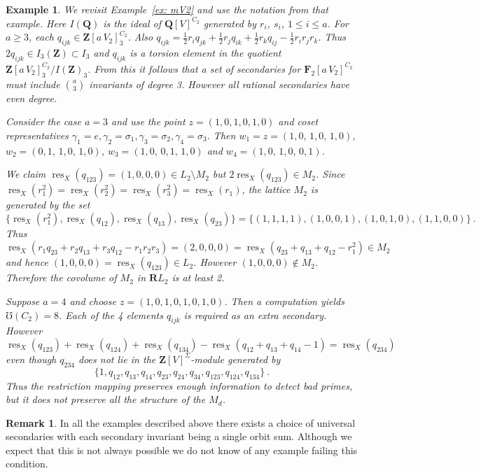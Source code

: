 \documentclass[12pt]{amsart}
\DeclareMathOperator{\res}{res}
\providecommand{\binom}[2]{{#1\choose#2}}
\renewcommand{\geq}{\geqslant}
\newcommand{\QQ}{\mathbf{Q}} %
\newcommand{\RR}{\mathbf{R}} %
\newcommand{\ZZ}{\mathbf{Z}} %
\newcommand{\FF}{\mathbf{F}} %
\newcommand{\QQ}{\mathbb{Q}} %
\newcommand{\RR}{\mathbb{R}} %
\newcommand{\ZZ}{\mathbb{Z}} %
\newcommand{\FF}{\mathbb{F}} %
\newtheorem{example}[thm]{Example}
\theoremstyle{definition}
\newtheorem{remark}[thm]{Remark}
\begin{document}
\begin{example}\label{mv2_comp}
  We revisit Example~\ref{ex: mV2} and use the notation from that example.
  Here $I(\QQ)$ is the ideal of $\QQ[V]^{C_2}$ generated by $r_i$, $s_i$, $1\le i \le a$. For $a \geq 3$, each $q_{ijk} \in \ZZ[a\,V_2]_3^{C_2}$.
Also  $q_{ijk}= \frac{1}{2} r_iq_{jk} + \frac{1}{2} r_jq_{ik} + \frac{1}{2} r_kq_{ij} - \frac{1}{2} r_{i}r_jr_k$.  Thus 
$2 q_{ijk} \in I_3(\ZZ) \subset I_3$ and $q_{ijk}$ is a torsion element in the quotient 
$\ZZ[a\,V_2]_3^{C_2}/I(\ZZ)_3$.  From this it follows that a set of secondaries for $\FF_2[a\,V_2]^{C_2}$
must include $\binom{a}{3}$ invariants of degree 3.  
However all rational secondaries have even degree.


Consider the case $a=3$ and use the point $z=(1,0,1,0,1,0)$ and coset representatives
$\gamma_1 = e,\gamma_2=\sigma_1, 
\gamma_3 = \sigma_2, \gamma_4 = \sigma_3$.
Then 
$w_1=z=(1,0,\,1,0,\,1,0)$,
  $w_2=(0,1,\,1,0,\,1,0)$,
  $w_3=(1,0,\,0,1,\,1,0)$ and 
  $w_4=(1,0,\,1,0,\,0,1)$.

We claim $\res_X(q_{123})=(1,0,0,0) \in L_2 \setminus M_2$
but $2\res_X(q_{123}) \in M_2$. Since $\res_X(r_1^2)=\res_X(r_2^2)=\res_X(r_3^2)=\res_X(r_1)$,
the lattice $M_2$ is generated by the set 
$$\{\res_X(r_1^2),\res_X(q_{12}),\res_X(q_{13}),\res_X(q_{23})\}
  = \{(1,1,1,1),(1,0,0,1),(1,0,1,0),(1,1,0,0)\}\ .$$
Thus
$\res_X(r_1 q_{23} + r_2 q_{13} + r_3 q_{12} - r_1 r_2 r_3) = (2,0,0,0)
 =\res_X(q_{23} + q_{13} + q_{12} - r_1^2) \in M_2$ and hence 
 $(1,0,0,0)=\res_X(q_{123}) \in L_2$.   However $(1,0,0,0) \notin M_2$.
 Therefore the covolume of $M_2$ in $\RR L_2$ is at least 2.

Suppose $a=4$ and choose $z=(1,0,1,0,1,0,1,0)$.  Then a computation yields $\mho({C_2})=8$.  Each of the 
4 elements $q_{ijk}$ is required as an extra secondary.
However 
$$\res_X(q_{123}) + \res_X(q_{124})+\res_X(q_{134})-
  \res_X(q_{12}+q_{13}+q_{14}-1) = \res_X(q_{234})$$
 even though $q_{234}$ does not lie in the 
 $\ZZ[V]^\Sigma$-module generated by 
 $$\{1,q_{12},q_{13},q_{14},q_{23},q_{24},q_{34},q_{123},q_{124},q_{134}\}\ .$$
Thus the restriction mapping preserves enough information to detect bad primes, but it
does not preserve all the structure of the $M_d$.  
\end{example}


  \begin{remark}
  In all the examples described above there exists a choice
  of universal secondaries with each secondary invariant
  being a single orbit sum.   Although we expect that this is not always possible we do not know of any example 
  failing this condition.
 \end{remark}
\end{document}

